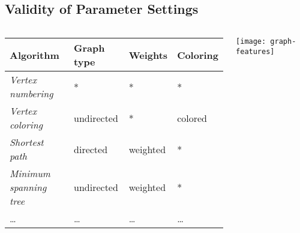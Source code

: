 \subsection{Validity of Parameter Settings}
\begin{frame}{\insertsubsection}
	\begin{columns}
			\begin{tabular}{llll}
			\toprule
			{\bf Algorithm} 							& {\bf Graph type} 	& {\bf Weights} & {\bf Coloring}  \\ \midrule
			{\em Vertex numbering}			  & *          				& *        			& *         			\\
			{\em Vertex coloring}       	& undirected 				& *        			& colored   			\\
			{\em Shortest path}        		& directed   				& weighted 			& *         			\\
			{\em Minimum spanning tree} 	& undirected 				& weighted 			& *         			\\
			\ldots         					& \ldots 			 			& \ldots 		  	& \ldots 					\\ \bottomrule
			\end{tabular}
			\vspace{5mm}	
			\texttt{[image: graph-features]}
	\end{columns}
\end{frame}

